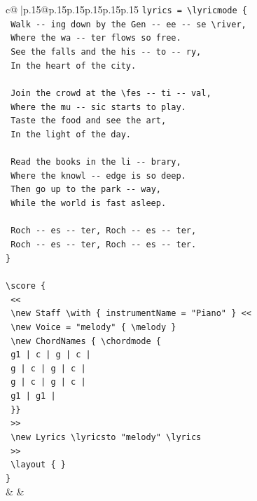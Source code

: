 \documentclass{article}
\begin{document}
{\begin{supertabular}{c@{$\;$}|p{.15\linewidth}@{}p{.15\linewidth}p{.15\linewidth}p{.15\linewidth}p{.15\linewidth}p{.15\linewidth}}
{{{\texttt{lyrics = \textbackslash{}lyricmode \{} \\
\texttt{  Walk {-}{-} ing down by the Gen {-}{-} ee {-}{-} se \textbackslash{}river,} \\
\texttt{  Where the wa {-}{-} ter flows so free.} \\
\texttt{  See the falls and the his {-}{-} to {-}{-} ry,} \\
\texttt{  In the heart of the city.} \\
\\ 
\texttt{  Join the crowd at the \textbackslash{}fes {-}{-} ti {-}{-} val,} \\
\texttt{  Where the mu {-}{-} sic starts to play.} \\
\texttt{  Taste the food and see the art,} \\
\texttt{  In the light of the day.} \\
\\ 
\texttt{  Read the books in the li {-}{-} brary,} \\
\texttt{  Where the knowl {-}{-} edge is so deep.} \\
\texttt{  Then go up to the park {-}{-} way,} \\
\texttt{  While the world is fast asleep.} \\
\\ 
\texttt{  Roch {-}{-} es {-}{-} ter, Roch {-}{-} es {-}{-} ter,} \\
\texttt{  Roch {-}{-} es {-}{-} ter, Roch {-}{-} es {-}{-} ter.} \\
\texttt{\}} \\
\\ 
\texttt{\textbackslash{}score \{} \\
\texttt{  <<} \\
\texttt{    \textbackslash{}new Staff \textbackslash{}with \{ instrumentName = "Piano" \} <<} \\
\texttt{      \textbackslash{}new Voice = "melody" \{ \textbackslash{}melody \}} \\
\texttt{      \textbackslash{}new ChordNames \{ \textbackslash{}chordmode \{} \\
\texttt{        g1 | c | g | c |} \\
\texttt{        g | c | g | c |} \\
\texttt{        g | c | g | c |} \\
\texttt{        g1 | g1 |} \\
\texttt{      \}\}} \\
\texttt{    >>} \\
\texttt{    \textbackslash{}new Lyrics \textbackslash{}lyricsto "melody" \textbackslash{}lyrics} \\
\texttt{  >>} \\
\texttt{  \textbackslash{}layout \{ \}} \\
\texttt{\}} \\
            }
        }
    }
    & & \\ \\


\end{supertabular}}
\end{document}

